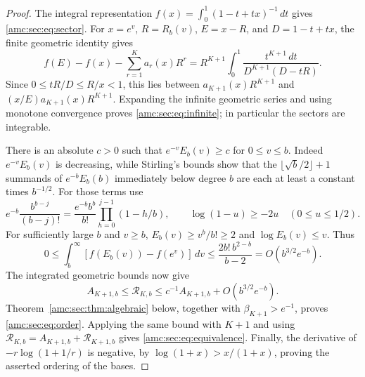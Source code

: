 \documentclass[11pt,letterpaper]{article}
\theoremstyle{remark}\newtheorem{remark}[theorem]{Remark}
\newcommand{\RR}{\mathcal R}
\begin{document}
\begin{proof}
The integral representation $f(x)=\int_0^1(1-t+tx)^{-1}\,dt$ gives \eqref{amc:sec:eq:sector}. For $x=e^v$, $R=R_b(v)$, $E=x-R$, and $D=1-t+tx$, the finite geometric identity gives
\begin{equation}\label{amc:sec:eq:positive-remainder}
 f(E)-f(x)-\sum_{r=1}^K a_r(x)R^r
 =R^{K+1}\int_0^1\frac{t^{K+1}\,dt}{D^{K+1}(D-tR)}.
\end{equation}
Since $0\le tR/D\le R/x<1$, this lies between
$a_{K+1}(x)R^{K+1}$ and $(x/E)a_{K+1}(x)R^{K+1}$. Expanding the infinite geometric series and using monotone convergence proves \eqref{amc:sec:eq:infinite}; in particular the sectors are integrable.

There is an absolute $c>0$ such that $e^{-v}E_b(v)\ge c$ for $0\le v\le b$. Indeed $e^{-v}E_b(v)$ is decreasing, while Stirling's bounds show that the $\lfloor\sqrt b/2\rfloor+1$ summands of $e^{-b}E_b(b)$ immediately below degree $b$ are each at least a constant times $b^{-1/2}$. For those terms use
\[
 e^{-b}\frac{b^{b-j}}{(b-j)!}
 =\frac{e^{-b}b^b}{b!}\prod_{h=0}^{j-1}(1-h/b),
 \qquad \log(1-u)\ge-2u\quad(0\le u\le1/2).
\]
For sufficiently large $b$ and $v\ge b$, $E_b(v)\ge v^b/b!\ge2$ and $\log E_b(v)\le v$. Thus
\[
 0\le\int_b^\infty[f(E_b(v))-f(e^v)]\,dv
 \le\frac{2b!\,b^{2-b}}{b-2}=O(b^{3/2}e^{-b}).
\]
The integrated geometric bounds now give
\begin{equation}\label{amc:sec:eq:sandwich}
 A_{K+1,b}\le\RR_{K,b}
 \le c^{-1}A_{K+1,b}+O(b^{3/2}e^{-b}).
\end{equation}
Theorem~\ref{amc:sec:thm:algebraic} below, together with $\beta_{K+1}>e^{-1}$, proves \eqref{amc:sec:eq:order}. Applying the same bound with $K+1$ and using
$\RR_{K,b}=A_{K+1,b}+\RR_{K+1,b}$ gives \eqref{amc:sec:eq:equivalence}. Finally, the derivative of $-r\log(1+1/r)$ is negative, by $\log(1+x)>x/(1+x)$, proving the asserted ordering of the bases.
\end{proof}
\end{document}
